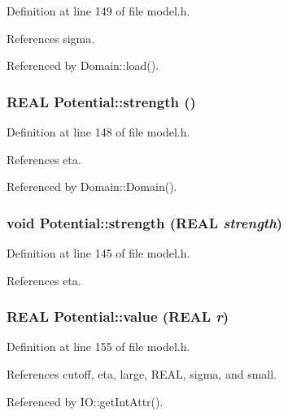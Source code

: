 Definition at line 149 of file model.h.

References sigma.

Referenced by Domain::load().\hypertarget{namespacePotential_dddc93ac78511fe0bb740eb7f60c0586}{
\subsubsection[{strength}]{\setlength{\rightskip}{0pt plus 5cm}REAL Potential::strength ()}}
\label{namespacePotential_dddc93ac78511fe0bb740eb7f60c0586}




Definition at line 148 of file model.h.

References eta.

Referenced by Domain::Domain().\hypertarget{namespacePotential_40f447bd2b6382c6a6e9170bcba9538a}{
\subsubsection[{strength}]{\setlength{\rightskip}{0pt plus 5cm}void Potential::strength (REAL {\em strength})}}
\label{namespacePotential_40f447bd2b6382c6a6e9170bcba9538a}




Definition at line 145 of file model.h.

References eta.\hypertarget{namespacePotential_b53f8127419fc9606a455218ad347074}{
\subsubsection[{value}]{\setlength{\rightskip}{0pt plus 5cm}REAL Potential::value (REAL {\em r})}}
\label{namespacePotential_b53f8127419fc9606a455218ad347074}




Definition at line 155 of file model.h.

References cutoff, eta, large, REAL, sigma, and small.

Referenced by IO::getIntAttr().

